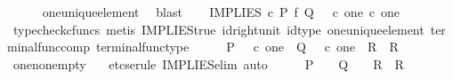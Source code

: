 \begin{isabellebody}
\ \ \ \ \isamarkupfalse%
\ one{\isacharunderscore}{\kern0pt}unique{\isacharunderscore}{\kern0pt}element\ \isamarkupfalse%
\ blast\isanewline
\ \ \isamarkupfalse%
\ {\isachardoublequoteopen}{\isacharparenleft}{\kern0pt}IMPLIES\ {\isasymcirc}\isactrlsub c\ {\isacharparenleft}{\kern0pt}P\ {\isasymtimes}\isactrlsub f\ Q{\isacharparenright}{\kern0pt}\ {\isacharequal}{\kern0pt}\ {\isasymt}\ {\isasymcirc}\isactrlsub c\ {\isasymbeta}\isactrlbsub one\ {\isasymtimes}\isactrlsub c\ one\isactrlesub {\isacharparenright}{\kern0pt}{\isachardoublequoteclose}\isanewline
\ \ \ \ \isamarkupfalse%
\ {\isacharparenleft}{\kern0pt}typecheck{\isacharunderscore}{\kern0pt}cfuncs{\isacharcomma}{\kern0pt}\ metis\ IMPLIES{\isacharunderscore}{\kern0pt}true\ id{\isacharunderscore}{\kern0pt}right{\isacharunderscore}{\kern0pt}unit{}\ id{\isacharunderscore}{\kern0pt}type\ one{\isacharunderscore}{\kern0pt}unique{\isacharunderscore}{\kern0pt}element\ terminal{\isacharunderscore}{\kern0pt}func{\isacharunderscore}{\kern0pt}comp\ terminal{\isacharunderscore}{\kern0pt}func{\isacharunderscore}{\kern0pt}type{\isacharparenright}{\kern0pt}\isanewline
\ \ \isamarkupfalse%
\ \isamarkupfalse%
\ {\isachardoublequoteopen}{\isacharparenleft}{\kern0pt}P\ {\isacharequal}{\kern0pt}\ {\isasymt}\ {\isasymcirc}\isactrlsub c\ {\isasymbeta}\isactrlbsub one\isactrlesub {\isacharparenright}{\kern0pt}\ {\isasymLongrightarrow}\ {\isacharparenleft}{\kern0pt}{\isacharparenleft}{\kern0pt}Q\ {\isacharequal}{\kern0pt}\ {\isasymt}\ {\isasymcirc}\isactrlsub c\ {\isasymbeta}\isactrlbsub one\isactrlesub {\isacharparenright}{\kern0pt}\ {\isasymLongrightarrow}\ R{\isacharparenright}{\kern0pt}\ {\isasymLongrightarrow}\ R{\isachardoublequoteclose}\isanewline
\ \ \ \ \isamarkupfalse%
\ one{\isacharunderscore}{\kern0pt}nonempty\ \isamarkupfalse%
\ {\isacharparenleft}{\kern0pt}{\isacharminus}{\kern0pt}{\isacharcomma}{\kern0pt}\ etcs{\isacharunderscore}{\kern0pt}erule\ IMPLIES{\isacharunderscore}{\kern0pt}elim{\isacharcomma}{\kern0pt}\ auto{\isacharparenright}{\kern0pt}\isanewline
\ \ \isamarkupfalse%
\ \isamarkupfalse%
\ {\isachardoublequoteopen}{\isacharparenleft}{\kern0pt}P\ {\isacharequal}{\kern0pt}\ {\isasymt}{\isacharparenright}{\kern0pt}\ {\isasymLongrightarrow}\ {\isacharparenleft}{\kern0pt}{\isacharparenleft}{\kern0pt}Q\ {\isacharequal}{\kern0pt}\ {\isasymt}{\isacharparenright}{\kern0pt}\ {\isasymLongrightarrow}\ R{\isacharparenright}{\kern0pt}\ {\isasymLongrightarrow}\ R{\isachardoublequoteclose}\isanewline

\end{isabellebody}

